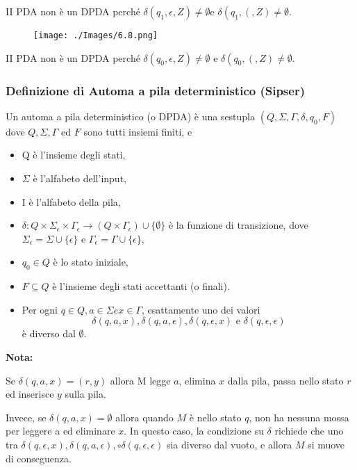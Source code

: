 II PDA non è un DPDA perché $\delta\left(q_{1}, \epsilon, Z\right) \neq \emptyset \mathrm{e}$ $\delta\left(q_{1},(, Z) \neq \emptyset\right.$.

\begin{figure}[hbpt!]
    \centering
    \texttt{[image: ./Images/6.8.png]}
\end{figure}
\FloatBarrier

II PDA non è un DPDA perché $\delta\left(q_{0}, \epsilon, Z\right) \neq \emptyset$ e $\delta\left(q_{0},(, Z) \neq \emptyset\right.$.

\subsubsection{Definizione di Automa a pila deterministico (Sipser)}
Un automa a pila deterministico (o DPDA) è una sestupla $\left(Q, \Sigma, \Gamma, \delta, q_{0}, F\right)$ dove $Q, \Sigma, \Gamma$ ed $F$ sono tutti insiemi finiti, e
\begin{itemize}
    \item Q è l'insieme degli stati,
    \item  $\Sigma$ è l'alfabeto dell'input,
    \item I è l'alfabeto della pila,
    \item $\delta: Q \times \Sigma_{\epsilon} \times \Gamma_{\epsilon} \rightarrow\left(Q \times \Gamma_{\epsilon}\right) \cup\{\emptyset\}$ è la funzione di transizione, dove $\Sigma_{\epsilon}=\Sigma \cup\{\epsilon\}$ e $\Gamma_{\epsilon}=\Gamma \cup\{\epsilon\}$,
    \item $q_{0} \in Q$ è lo stato iniziale,
    \item $F \subseteq Q$ è l'insieme degli stati accettanti (o finali).
    \item Per ogni $q \in Q, a \in \Sigma e x \in \Gamma$, esattamente uno dei valori
$$
\delta(q, a, x), \delta(q, a, \epsilon), \delta(q, \epsilon, x) \text { e } \delta(q, \epsilon, \epsilon)
$$
è diverso dal $\emptyset$.
\end{itemize}


\textbf{Nota:}

Se $\delta(q, a, x)=(r, y)$ allora M legge $a$, elimina $x$ dalla pila, passa nello stato $r$ ed inserisce $y$ sulla pila.

\vspace{5mm}

Invece, se $\delta(q, a, x)=\emptyset$ allora quando $M$ è nello stato $q$, non ha nessuna mossa per leggere a ed eliminare $x$. In questo caso, la condizione su $\delta$ richiede che uno tra $\delta(q, \epsilon, x), \delta(q, a, \epsilon), \circ \delta(q, \epsilon, \epsilon)$ sia diverso dal vuoto, e allora $M$ si muove di conseguenza.

